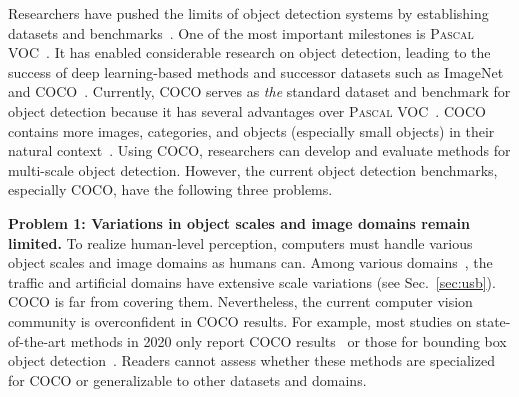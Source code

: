 \documentclass[10pt,twocolumn,letterpaper]{article}
\newcommand{\Pascal}{\textsc{Pascal}\xspace}
\begin{document}
Researchers have pushed the limits of object detection systems
by establishing datasets and benchmarks~\cite{object_detection_survey_Liu_IJCV2020}.
One of the most important milestones is \Pascal VOC~\cite{PASCALVOC_IJCV2015}.
It has enabled considerable research on object detection,
leading to the success of deep learning-based methods and successor datasets such as ImageNet~\cite{ImageNet_IJCV2015} and COCO~\cite{COCO_ECCV2014}.
Currently, COCO serves as \textit{the} standard dataset and benchmark for object detection
because it has several advantages over \Pascal VOC~\cite{PASCALVOC_IJCV2015}.
COCO contains more images, categories, and objects (especially small objects) in their natural context~\cite{COCO_ECCV2014}.
Using COCO, researchers can develop and evaluate methods for multi-scale object detection.
However, the current object detection benchmarks, especially COCO, have the following three problems.

\textbf{Problem 1: Variations in object scales and image domains remain limited.}
To realize human-level perception,
computers must handle various object scales and image domains as humans can.
Among various domains~\cite{UniversalObjectDetection_CVPR2019},
the traffic and artificial domains have extensive scale variations (see Sec.~\ref{sec:usb}).
COCO is far from covering them.
Nevertheless, the current computer vision community is overconfident in COCO results.
For example, most studies on state-of-the-art methods in 2020
only report COCO results~\cite{ATSS_CVPR2020, SEPC_CVPR2020, PAA_ECCV2020, GFL_NeurIPS2020, RepPointsv2_NeurIPS2020, RelationNet2_NeurIPS2020} or
those for bounding box object detection~\cite{EfficientDet_CVPR2020, SpineNet_CVPR2020, YOLOv4_2020, DetectoRS_2020}.
Readers cannot assess whether these methods are specialized for COCO or generalizable to other datasets and domains.
\end{document}
